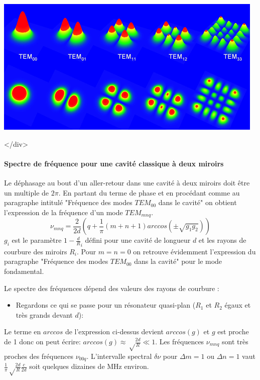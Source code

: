 \documentclass{book}
\begin{document}
{\centering
\includegraphics[scale=1.7]{images/fig20.jpg}
\par}

</div>
\paragraph{Spectre de fréquence pour une cavité classique à deux miroirs}
Le déphasage au bout d'un aller-retour dans une cavité à deux miroirs doit être un multiple de \(2\pi\). En partant du terme de phase et en procédant comme au paragraphe intitulé "Fréquence des modes \(TEM_{00}\) dans le cavité" on obtient l'expression de la fréquence d'un mode \(TEM_{mnq}\).
\[\nu_{mnq}=\frac 2{2d}\left(q+\frac 1\pi (m+n+1) arccos(\pm\sqrt{g_1g_2})\right)\]
\(g_i\) est le paramètre \(1-\frac d R_i\) défini pour une cavité de longueur \(d\) et les rayons de courbure des miroirs \(R_i\). Pour \(m=n=0\) on retrouve évidemment l'expression du paragraphe "Fréquence des modes \(TEM_{00}\) dans la cavité" pour le mode fondamental.

Le spectre des fréquences dépend des valeurs des rayons de courbure :

\begin{itemize}
    \item Regardons ce qui se passe pour un résonateur quasi-plan (\(R_1\) et \(R_2\) égaux et très grands devant \(d\)):
\end{itemize}

Le terme en \(arccos\) de l'expression ci-dessus devient \(arccos(g)\) et \(g\) est proche de 1 donc on peut écrire: \(arccos(g)\approx\sqrt\frac {2d}R \ll 1\). Les fréquences \(\nu_{mnq}\) sont très proches des fréquences \(\nu_{00q}\). L'intervalle spectral \(\delta\nu\) pour
\(\Delta m =1\) ou \(\Delta n =1\) vaut \(\frac 1 \pi \sqrt \frac{2d}R\frac c{2d}\) soit quelques dizaines de MHz environ.
\end{document}
